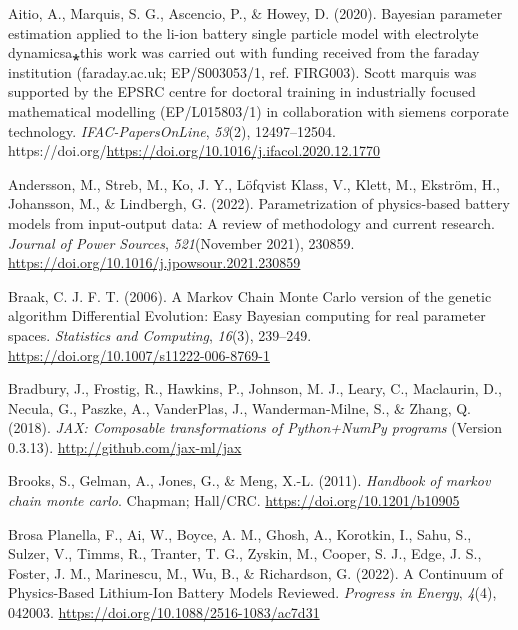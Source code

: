 \documentclass[
]{article}
\newlength{\cslhangindent}
\newenvironment{CSLReferences}[2] %
 {\begin{list}{}{%
  \setlength{\itemindent}{0pt}
  \setlength{\leftmargin}{0pt}
  \setlength{\parsep}{0pt}
  \ifodd #1
   \setlength{\leftmargin}{\cslhangindent}
   \setlength{\itemindent}{-1\cslhangindent}
  \fi
  \setlength{\itemsep}{#2\baselineskip}}}
 {\end{list}}
\begin{document}
\label{refs}
\begin{CSLReferences}{1}{0}
Aitio, A., Marquis, S. G., Ascencio, P., \& Howey, D. (2020). Bayesian
parameter estimation applied to the li-ion battery single particle model
with electrolyte dynamicsa⁎this work was carried out with funding
received from the faraday institution (faraday.ac.uk; EP/S003053/1, ref.
FIRG003). Scott marquis was supported by the EPSRC centre for doctoral
training in industrially focused mathematical modelling (EP/L015803/1)
in collaboration with siemens corporate technology.
\emph{IFAC-PapersOnLine}, \emph{53}(2), 12497--12504.
https://doi.org/\url{https://doi.org/10.1016/j.ifacol.2020.12.1770}

Andersson, M., Streb, M., Ko, J. Y., Löfqvist Klass, V., Klett, M.,
Ekström, H., Johansson, M., \& Lindbergh, G. (2022). Parametrization of
physics-based battery models from input-output data: {A} review of
methodology and current research. \emph{Journal of Power Sources},
\emph{521}(November 2021), 230859.
\url{https://doi.org/10.1016/j.jpowsour.2021.230859}

Braak, C. J. F. T. (2006). A {Markov} {Chain} {Monte} {Carlo} version of
the genetic algorithm {Differential} {Evolution}: Easy {Bayesian}
computing for real parameter spaces. \emph{Statistics and Computing},
\emph{16}(3), 239--249. \url{https://doi.org/10.1007/s11222-006-8769-1}

Bradbury, J., Frostig, R., Hawkins, P., Johnson, M. J., Leary, C.,
Maclaurin, D., Necula, G., Paszke, A., VanderPlas, J., Wanderman-Milne,
S., \& Zhang, Q. (2018). \emph{{JAX}: Composable transformations of
{P}ython+{N}um{P}y programs} (Version 0.3.13).
\url{http://github.com/jax-ml/jax}

Brooks, S., Gelman, A., Jones, G., \& Meng, X.-L. (2011). \emph{Handbook
of markov chain monte carlo}. Chapman; Hall/CRC.
\url{https://doi.org/10.1201/b10905}

Brosa Planella, F., Ai, W., Boyce, A. M., Ghosh, A., Korotkin, I., Sahu,
S., Sulzer, V., Timms, R., Tranter, T. G., Zyskin, M., Cooper, S. J.,
Edge, J. S., Foster, J. M., Marinescu, M., Wu, B., \& Richardson, G.
(2022). {A Continuum of Physics-Based Lithium-Ion Battery Models
Reviewed}. \emph{Progress in Energy}, \emph{4}(4), 042003.
\url{https://doi.org/10.1088/2516-1083/ac7d31}


\end{CSLReferences}
\end{document}
